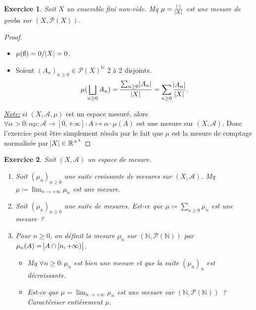 \documentclass{article}
\newtheorem{ex}{Exercice}[section]
\theoremstyle{definition}
\newcommand{\pinfty}{{+\infty}}
\newcommand{\N}{{\mathbb N}}
\newcommand{\R}{{\mathbb R}}
\begin{document}
\begin{ex} Soit $X$ un ensemble fini non-vide. Mq $\mu = \frac {\abs \cdot}{\abs X}$ est une mesure de proba sur $(X, \mathcal P(X))$.
\end{ex}

\begin{proof}~
\begin{itemize}
	\item $\mu(\emptyset) = 0/\abs X = 0$.
	\item Soient $(A_n)_{n \geq 0} \in \mathcal P(X)^\N$ 2 à 2 disjoints.
	\[\mu(\bigsqcup_{n \geq 0}A_n) = \frac {\sum_{n \geq 0}\abs {A_n}}{\abs X} = \sum_{n \geq 0}\frac {\abs {A_n}}{\abs X}.\]
\end{itemize}

\underline {\textit{Note:}} si $(X, \mathcal A, \mu)$ est un espace mesuré, alors $\forall \alpha > 0 : \alpha\mu : \mathcal A \to [0, \pinfty] : A \mapsto \alpha \cdot \mu(A)$
est une mesure sur $(X, \mathcal A)$. Donc l'exercice peut être simplement résolu par le fait que $\mu$ est la mesure de comptage normalisée par $\abs X \in {\R^+}^*$
\end{proof}

\begin{ex} Soit $(X, \mathcal A)$ un espace de mesure.
\begin{enumerate}
	\item Soit $(\mu_n)_{n \geq 0}$ une suite croissante de mesures sur $(X, \mathcal A)$. Mq $\mu \coloneqq \lim_{n \to \pinfty}\mu_n$ est une mesure.
	\item Soit $(\mu_n)_{n \geq 0}$ une suite de mesures. Est-ce que $\mu \coloneqq \sum_{n \geq 0}\mu_n$ est une mesure~?
	\item Pour $n \geq 0$, on définit la mesure $\mu_n$ sur $(\N, \mathcal P(\N))$ par $\mu_n(A) = \abs {A \cap [n, \pinfty)}$.
	\begin{itemize}
		\item Mq $\forall n \geq 0 : \mu_n$ est bien une mesure et que la suite $(\mu_n)_n$ est décroissante.
		\item Est-ce que $\mu = \lim_{n \to \pinfty}\mu_n$ est une mesure sur $(\N, \mathcal P(\N))$~? Caractériser entièrement $\mu$.
	\end{itemize}
\end{enumerate}
\end{ex}
\end{document}
